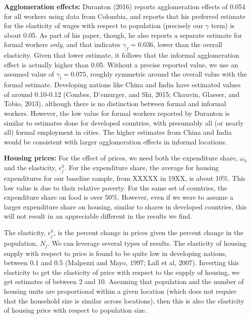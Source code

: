 \documentclass[10pt]{article}
\begin{document}
\textbf{Agglomeration effects:} Duranton (2016) reports agglomeration effects of 0.054 for all workers using data from Colombia, and reports that his preferred estimate for the elasticity of wages with respect to population (precisely our $\gamma$ term) is about 0.05. As part of his paper, though, he also reports a separate estimate for formal workers \textit{only}, and that indicates $\gamma_f = 0.036$, lower than the overall elasticity. Given that lower estimate, it follows that the informal agglomeration effect is actually higher than 0.05. Without a precise reported value, we use an assumed value of $\gamma_l = 0.075$, roughly symmetric around the overall value with the formal estimate. Developing nations like China and India have estimated values of around 0.10-0.12 (Combes, D'emurger, and Shi, 2015; Chauvin, Glaeser, and Tobio, 2013), although there is no distinction between formal and informal workers. However, the low value for formal workers reported by Duranton is similar to estimates done for developed countries, with presumably all (or nearly all) formal employment in cities. The higher estimates from China and India would be consistent with larger agglomeration effects in informal locations.

\textbf{Housing prices:} For the effect of prices, we need both the expenditure share, $\omega_h$ and the elasticity, $\epsilon^h_j$. For the expenditure share, the average for housing expenditures for our baseline sample, from XXXXX in 19XX, is about 10\%. This low value is due to their relative poverty. For the same set of countries, the expenditure share on food is over 50\%. However, even if we were to assume a larger expenditure share on housing, similar to shares in developed countries, this will not result in an appreciable different in the results we find.

The elasticity, $\epsilon^h_j$, is the percent change in prices given the percent change in the population, $N_j$. We can leverage several types of results. The elasticity of housing supply with respect to price is found to be quite low in developing nations, between 0.1 and 0.5 (Malpezzi and Mayo, 1997; Lall et al, 2007). Inverting this elasticity to get the elasticity of price with respect to the supply of housing, we get estimates of between 2 and 10. Assuming that population and the number of housing units are proportional within a given location (which does not require that the household size is similar across locations), then this is also the elasticity of housing price with respect to population size.
\end{document}
